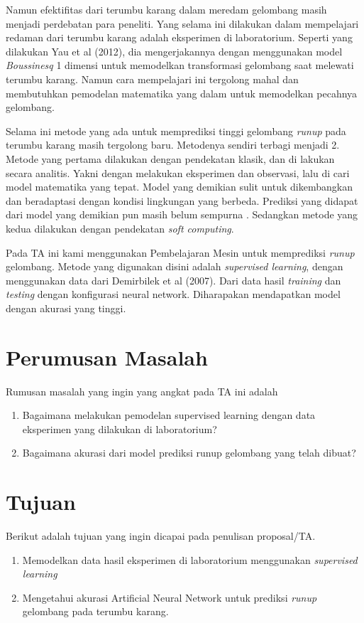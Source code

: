 Namun efektifitas dari terumbu karang dalam meredam gelombang masih menjadi perdebatan para peneliti. Yang selama ini dilakukan dalam mempelajari redaman dari terumbu karang adalah eksperimen di laboratorium. Seperti yang dilakukan Yau et al (2012)\cite{YAO201230}, dia mengerjakannya dengan menggunakan model \emph{Boussinesq} 1 dimensi untuk memodelkan transformasi gelombang saat melewati terumbu karang.  Namun cara mempelajari ini tergolong mahal dan membutuhkan pemodelan matematika yang dalam untuk memodelkan pecahnya gelombang.

Selama ini metode yang ada untuk memprediksi tinggi gelombang \emph{runup} pada terumbu karang masih tergolong baru. Metodenya sendiri terbagi menjadi 2. Metode yang pertama dilakukan dengan pendekatan klasik, dan di lakukan secara analitis. Yakni dengan melakukan eksperimen dan observasi, lalu di cari model matematika yang tepat. Model yang demikian sulit untuk dikembangkan dan beradaptasi dengan kondisi lingkungan yang berbeda. Prediksi yang didapat dari model yang demikian pun masih belum sempurna \cite{DemirbilekBoussinesq}. Sedangkan metode yang kedua dilakukan dengan pendekatan \emph{soft computing}.

Pada TA ini kami menggunakan Pembelajaran Mesin untuk memprediksi \emph{runup} gelombang. Metode yang digunakan disini adalah \emph{supervised learning}, dengan menggunakan data dari Demirbilek et al (2007)\cite{DemirbilekReport}. Dari data hasil \emph{training} dan \emph{testing} dengan konfigurasi neural network. Diharapakan mendapatkan model dengan akurasi yang tinggi.

\section{Perumusan Masalah}
Rumusan masalah yang ingin yang angkat pada TA ini adalah
\begin{enumerate}
    \item Bagaimana melakukan pemodelan supervised learning dengan data eksperimen yang dilakukan di laboratorium?
    \item Bagaimana akurasi dari model prediksi runup gelombang yang telah dibuat?
\end{enumerate}
\section{Tujuan}
Berikut adalah tujuan yang ingin dicapai pada penulisan proposal/TA.
\begin{enumerate}
    \item Memodelkan data hasil eksperimen di laboratorium menggunakan \emph{supervised learning}
    \item Mengetahui akurasi Artificial Neural Network untuk prediksi \emph{runup} gelombang pada terumbu karang.
\end{enumerate}
